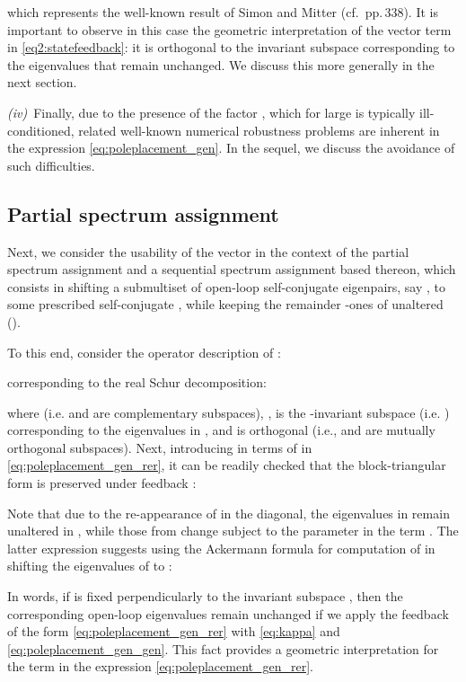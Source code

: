 \documentclass[conference]{IEEEtran}
\begin{document}
which represents the well-known result of Simon and Mitter
\cite{SimMit68} (cf.~{pp.\,338}). It is important to observe in this
case the geometric interpretation of the vector term  in
\eqref{eq2:statefeedback}: it is {orthogonal to the invariant
  subspace} corresponding to the {eigenvalues that remain
  unchanged}. We discuss this more generally in the next section.




\emph{(iv)}~Finally, due to the presence of the factor
, which for large  is typically ill-conditioned,
related well-known numerical robustness problems are inherent in the
expression \eqref{eq:poleplacement_gen}. In the sequel, we discuss the
avoidance of such difficulties. 











\subsection{Partial spectrum assignment}
\label{Partial pole placement}
Next, we consider the usability of the vector  in the context of the partial spectrum assignment and a sequential spectrum assignment based thereon, which consists in shifting a submultiset of open-loop self-conjugate eigenpairs, say , to some prescribed self-conjugate , while keeping the remainder -ones of  unaltered (). 

To this end, consider the operator description of :
\vspace{-5pt}

\vspace{-5pt}
 corresponding to the real Schur decomposition:

where  (i.e.  and  are complementary subspaces), ,  is the -invariant subspace (i.e. ) corresponding to the eigenvalues in , and  is orthogonal (i.e.,  and  are mutually orthogonal subspaces).
Next, introducing 
in terms of  in \eqref{eq:poleplacement_gen_rer}, it can be readily checked that the block-triangular form is preserved under feedback \cite{Saad86}:

Note that due to the re-appearance of  in the diagonal, the eigenvalues in   remain unaltered in , while those from   change subject to the parameter  in the term .  The latter expression suggests using the Ackermann formula for computation of  in shifting the eigenvalues  of  to :

In words, {if  is fixed perpendicularly to the invariant subspace , then the corresponding open-loop eigenvalues remain unchanged} if we apply the feedback of the form \eqref{eq:poleplacement_gen_rer} with \eqref{eq:kappa} and \eqref{eq:poleplacement_gen_gen}. This fact provides a geometric interpretation for the term  in the expression \eqref{eq:poleplacement_gen_rer}.
\end{document}
